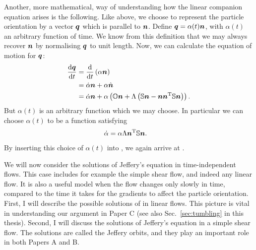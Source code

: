 \documentclass[thesis.tex]{subfiles}
\begin{document}
Another, more mathematical, way of understanding how the linear companion equation  arises is the following. Like above, we choose to represent the particle orientation by a vector $\mbox{\boldmath$q$}$ which is parallel to $\mbox{\boldmath$n$}$. Define $\mbox{\boldmath$q$} = \alpha(t)\mbox{\boldmath$n$}$, with $\alpha(t)$ an arbitrary function of time. We know from this definition that we may always recover $\mbox{\boldmath$n$}$ by normalising $\mbox{\boldmath$q$}$ to unit length. Now, we can calculate the equation of motion for $\mbox{\boldmath$q$}$:
\begin{align}
	\diff{\ve q}{t} &= \diff{}{t}\left(\alpha \ve n\right) \nn \\
	&= \dot \alpha \ve n + \alpha \dot{\ve n} \nn\\
	&= \dot \alpha \ve n + \alpha \left(\ma O \ve n + \Lambda \left(\ma S \ve n - \ve n \ve n \transpose \ma S \ve n\right)\right). \eqnlab{jefferyderivation1}
\end{align}
But $\alpha(t)$ is an arbitrary function which we may choose. In particular we can choose $\alpha(t)$ to be a function satisfying
\begin{align*}
	\dot \alpha &= \alpha \Lambda \mbox{\boldmath$n$}^{\mathrm T} \mathbb{S} \mbox{\boldmath$n$}.
\end{align*}
By inserting this choice of $\alpha(t)$ into , we again arrive at .

We will now consider the solutions of Jeffery's equation in time-independent flows. This case includes for example the simple shear flow, and indeed any linear flow. It is also a useful model when the flow changes only slowly in time, compared to the time it takes for the gradients to affect the particle orientation. First, I will describe the possible solutions of  in linear flows. This picture is vital in understanding our argument in Paper C (see also Sec.~\ref{sec:tumbling} in this thesis). Second, I will discuss the solutions of Jeffery's equation in a simple shear flow. The solutions are called the Jeffery orbits, and they play an important role in both Papers A and B.
\end{document}
